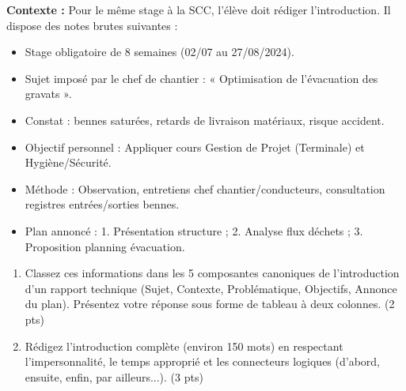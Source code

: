 \documentclass[11pt]{article}
\begin{document}
\begin{exercice}
    \textbf{Contexte :} Pour le même stage à la SCC, l'élève doit rédiger l'introduction. Il dispose des notes brutes suivantes :
    \begin{itemize}
        \item Stage obligatoire de 8 semaines (02/07 au 27/08/2024).
        \item Sujet imposé par le chef de chantier : « Optimisation de l'évacuation des gravats ».
        \item Constat : bennes saturées, retards de livraison matériaux, risque accident.
        \item Objectif personnel : Appliquer cours Gestion de Projet (Terminale) et Hygiène/Sécurité.
        \item Méthode : Observation, entretiens chef chantier/conducteurs, consultation registres entrées/sorties bennes.
        \item Plan annoncé : 1. Présentation structure ; 2. Analyse flux déchets ; 3. Proposition planning évacuation.
    \end{itemize}
    
    \begin{enumerate}
        \item Classez ces informations dans les 5 composantes canoniques de l'introduction d'un rapport technique (Sujet, Contexte, Problématique, Objectifs, Annonce du plan). Présentez votre réponse sous forme de tableau à deux colonnes. (2 pts)
        \item Rédigez l'introduction complète (environ 150 mots) en respectant l'impersonnalité, le temps approprié et les connecteurs logiques (d'abord, ensuite, enfin, par ailleurs...). (3 pts)
    \end{enumerate}
\end{exercice}
\end{document}
